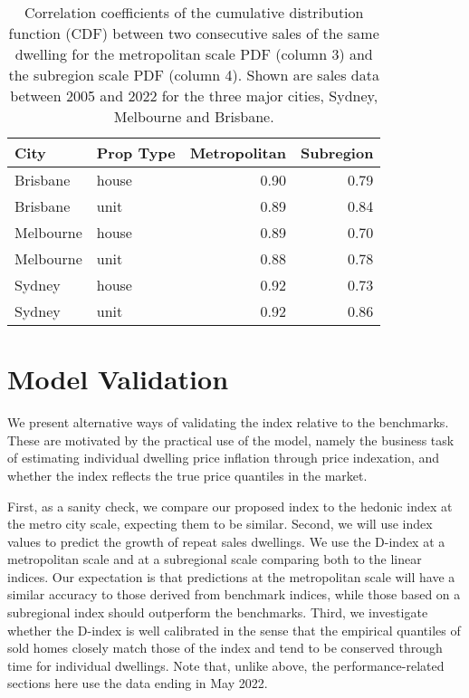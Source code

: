 \begin{table}[h!]
\centering

\begin{tabular}{llrr}
\toprule
     City & Prop Type &  Metropolitan &  Subregion \\
\midrule
 Brisbane &     house &   0.90 &       0.79 \\
 Brisbane &      unit &   0.89 &       0.84 \\
Melbourne &     house &   0.89 &       0.70 \\
Melbourne &      unit &   0.88 &       0.78 \\
   Sydney &     house &   0.92 &       0.73 \\
   Sydney &      unit &   0.92 &       0.86 \\
\bottomrule
\end{tabular}

\caption{Correlation coefficients of the cumulative distribution function (CDF) between two consecutive sales of the same dwelling for the metropolitan scale PDF (column 3) and the subregion scale PDF (column 4). Shown are sales data between 2005 and 2022 for the three major cities, Sydney, Melbourne and Brisbane.}
\label{table:cdf_persistence}
\end{table}



\section{Model Validation}
\label{sec:performance}

We present alternative ways of validating the index relative to the benchmarks. These are motivated by the practical use of the model, namely the business task of estimating individual dwelling price inflation through price indexation, and whether the index reflects the true price quantiles in the market.

First, as a sanity check, we compare our proposed index to the hedonic index at the metro city scale, expecting them to be similar. Second, we will use index values to predict the growth of repeat sales dwellings. We use the D-index at a metropolitan scale and at a subregional scale comparing both to the linear indices. Our expectation is that predictions at the metropolitan scale will have a similar accuracy to those derived from benchmark indices, while those based on a subregional index should outperform the benchmarks. Third, we investigate whether the D-index is well calibrated in the sense that the empirical quantiles of sold homes closely match those of the index and tend to be conserved through time for individual dwellings. 
Note that, unlike above, the performance-related sections here use the data ending in May 2022.


